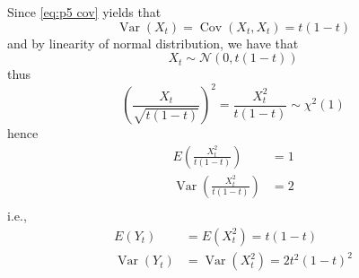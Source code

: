 \documentclass{homework}
\DeclareMathOperator{\var}{Var}
\DeclareMathOperator{\cov}{Cov}
\begin{document}
\begin{subproblem}
        \item
        Since \cref{eq:p5 cov} yields that
        \[\var(X_t)=\cov(X_t,X_t)=t(1-t)\]
        and by linearity of normal distribution, we have that
        \[X_t\sim \mathcal N(0,t(1-t))\]
        thus
        \[\left(\frac{X_t}{\sqrt{t(1-t)}}\right)^2
        =\frac{X_t^2}{t(1-t)}\sim\chi^2(1)\]
        hence
        \[\begin{aligned}
            E\left(\frac{X_t^2}{t(1-t)}\right)&=1\\
            \var\left(\frac{X_t^2}{t(1-t)}\right)&=2\\
        \end{aligned}\]
        i.e.,
        \[\begin{aligned}
            E(Y_t)&=E(X_t^2)=t(1-t)\\
            \var(Y_t)&=\var(X_t^2)=2t^2(1-t)^2
        \end{aligned}\]
    \end{subproblem}
    
\end{document}
